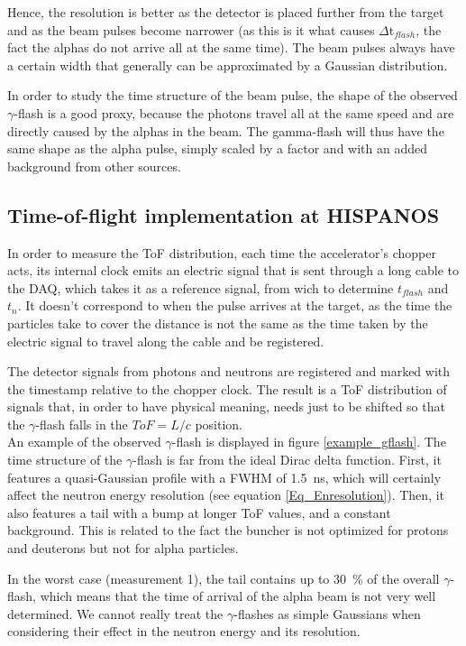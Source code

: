 \documentclass[a4paper,12pt]{report}
\begin{document}
Hence, the resolution is better as the detector is placed further from the target and as the beam pulses become narrower (as this is it what causes  $\Delta$t$_{flash}$, the fact the alphas do not arrive all at the same time).
The beam pulses always have a certain width that generally can be approximated by a Gaussian distribution.

In order to study the time structure of the beam pulse, the shape of the observed $\gamma$-flash is a good proxy, because the photons travel all at the same speed and are directly caused by the alphas in the beam.
The gamma-flash will thus have the same shape as the alpha pulse, simply scaled by a factor and with an added background from other sources.

\subsection{Time-of-flight implementation at HISPANOS} 
In order to measure the ToF distribution, each time the accelerator's chopper acts, its internal clock emits an electric signal that is sent through a long cable to the DAQ, which takes it as a reference signal, from wich to determine $t_{flash}$ and $t_n$.
It doesn't correspond to when the pulse arrives at the target, as the time the particles take to cover the distance is not the same as the time taken by the electric signal to travel along the cable and be registered.

The detector signals from photons and neutrons are registered and marked with the timestamp relative to the chopper clock.
The result is a ToF distribution of signals that, in order to have physical meaning, needs just to be shifted so that the $\gamma$-flash falls in the $ToF=L/c$ position.
\\

An example of the observed $\gamma$-flash is displayed in figure \ref{example_gflash}.	%
The time structure of the $\gamma$-flash is far from the ideal Dirac delta function.
First, it features a quasi-Gaussian profile with a FWHM of \qty{1.5}{\nano\second}, which will certainly affect the neutron energy resolution (see equation \ref{Eq_Enresolution}).
Then, it also features a tail with a bump at longer ToF values, and a constant background.
This is related to the fact the buncher is not optimized for protons and deuterons but not for alpha particles.

In the worst case (measurement 1), the tail contains up to \qty{30}{\percent} of the overall $\gamma$-flash, which means that the time of arrival of the alpha beam is not very well determined.
We cannot really treat the $\gamma$-flashes as simple Gaussians when considering their effect in the neutron energy and its resolution.
\end{document}
